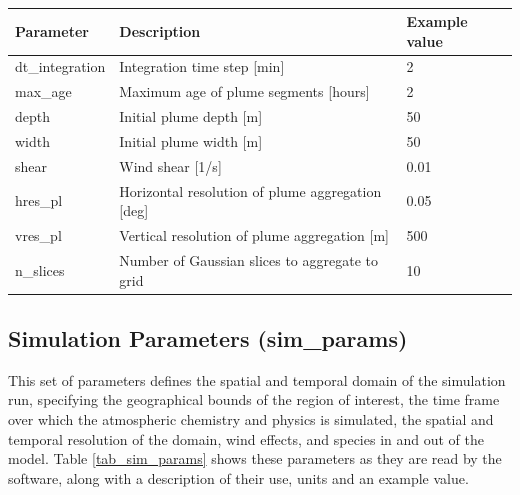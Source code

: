 \begin{table}[H]
\caption{}
\label{tab_plume_params}
\centering
\begin{tabular}{lll}
\hline
\textbf{Parameter}      & \textbf{Description}                                     & \textbf{Example value} \\ \hline
dt\_integration & Integration time step [min]                     & 2             \\
max\_age        & Maximum age of plume segments [hours]           & 2             \\
depth          & Initial plume depth [m]                         & 50            \\
width          & Initial plume width [m]                         & 50            \\
shear          & Wind shear [1/s]                                & 0.01          \\
hres\_pl        & Horizontal resolution of plume aggregation [deg] & 0.05          \\
vres\_pl        & Vertical resolution of plume aggregation [m]   & 500           \\
n\_slices       & Number of Gaussian slices to aggregate to grid  & 10	\\ \hline           
\end{tabular}
\end{table}

\subsection{Simulation Parameters (sim\_params)}
This set of parameters defines the spatial and temporal domain of the simulation run, specifying the geographical bounds of the region of interest, the time frame over which the atmospheric chemistry and physics is simulated, the spatial and temporal resolution of the domain, wind effects, and species in and out of the model. Table \ref{tab_sim_params} shows these parameters as they are read by the software, along with a description of their use, units and an example value.

